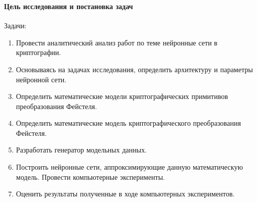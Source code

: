 \documentclass[notheorems]{beamer}
\theoremstyle{plain}
\theoremstyle{definition}
\theoremstyle{remark}
\begin{document}
\begin{frame}
	\frametitle{\secname}
	\framesubtitle{Цель исследования и постановка задач}
Задачи:
\begin{enumerate}
	\item Провести аналитический анализ работ по теме нейронные сети в криптографии.

	\item Основываясь на задачах исследования, определить архитектуру и параметры нейронной сети.
	
	\item Определить математические модели криптографических примитивов преобразования Фейстеля.
	
	\item Определить математические модель криптографического преобразования Фейстеля.
	
	\item Разработать генератор модельных данных.
	
	\item Построить нейронные сети, аппроксимирующие данную математическую модель. Провести компьютерные эксперименты.
	
	\item Оценить результаты полученные в ходе компьютерных экспериментов.
\end{enumerate}
\end{frame}
\end{document}
